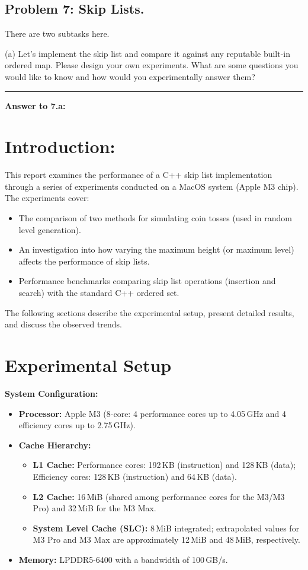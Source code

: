 \documentclass{article}
\begin{document}
\subsection*{Problem 7: Skip Lists.} There are two subtasks here.

(a) Let's implement the skip list and compare it against any reputable built-in ordered map. Please design your own experiments. What are some questions you would like to know and how would you experimentally answer them?

\vspace{0.5em}
\hrule
\vspace{.5em}

\textbf{Answer to 7.a:}

\section{Introduction:}
This report examines the performance of a C++ skip list implementation through a series of experiments conducted on a MacOS system (Apple M3 chip). The experiments cover:
\begin{itemize}
    \item The comparison of two methods for simulating coin tosses (used in random level generation).
    \item An investigation into how varying the maximum height (or maximum level) affects the performance of skip lists.
    \item Performance benchmarks comparing skip list operations (insertion and search) with the standard C++ ordered set.
\end{itemize}
The following sections describe the experimental setup, present detailed results, and discuss the observed trends.

\section{Experimental Setup}
\textbf{System Configuration:}
\begin{itemize}
    \item \textbf{Processor:} Apple M3 (8-core: 4 performance cores up to 4.05\,GHz and 4 efficiency cores up to 2.75\,GHz).
    \item \textbf{Cache Hierarchy:}
    \begin{itemize}
        \item \textbf{L1 Cache:} Performance cores: 192\,KB (instruction) and 128\,KB (data); Efficiency cores: 128\,KB (instruction) and 64\,KB (data).
        \item \textbf{L2 Cache:} 16\,MiB (shared among performance cores for the M3/M3 Pro) and 32\,MiB for the M3 Max.
        \item \textbf{System Level Cache (SLC):} 8\,MiB integrated; extrapolated values for M3 Pro and M3 Max are approximately 12\,MiB and 48\,MiB, respectively.
    \end{itemize}
    \item \textbf{Memory:} LPDDR5-6400 with a bandwidth of 100\,GB/s.
\end{itemize}
\end{document}
